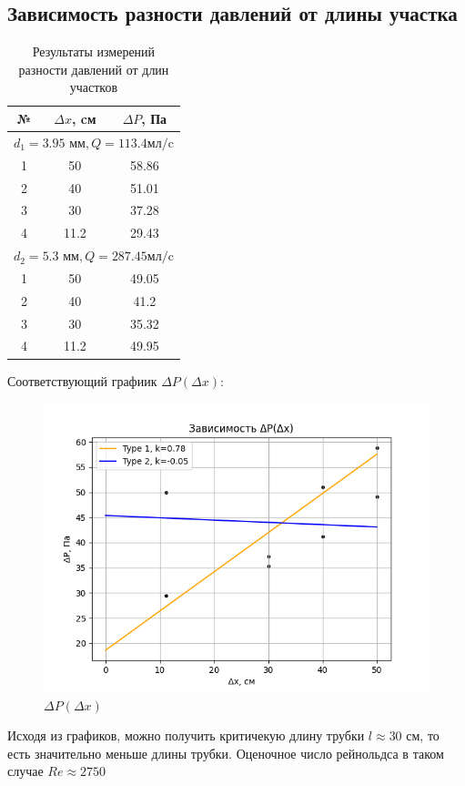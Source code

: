 \documentclass[a4paper, 10pt, twocolumn]{article}
\begin{document}
\subsection{Зависимость разности давлений от длины участка}
\begin{table}[H]
    \centering
    \begin{tabular}{|c|c|c|} \hline
    № & $\Delta x$, cм & $\Delta P$, Па \\ \hline
    \multicolumn{3}{|c|}{$d_1 = 3.95 \text{~мм}, Q = 113.4 \text{мл/c}$} \\ \hline
    1  & 50   & 58.86 \\ \hline
    2  & 40   & 51.01 \\ \hline
    3  & 30   & 37.28 \\ \hline
    4  & 11.2 & 29.43 \\ \hline
    \multicolumn{3}{|c|}{$d_2 = 5.3 \text{~мм}, Q = 287.45 \text{мл/c}$} \\ \hline
    1  & 50   & 49.05 \\ \hline
    2  & 40   & 41.2  \\ \hline
    3  & 30   & 35.32 \\ \hline
    4  & 11.2 & 49.95 \\ \hline
    \end{tabular}
    \caption{Результаты измерений разности давлений от длин участков}
\end{table}
Соответствующий графиик $\Delta P(\Delta x)$:
    \begin{figure}[H]
        \includegraphics[width=1\linewidth]{graphs/figure2.png}
        \begin{center}
            \caption{$\Delta P(\Delta x)$}
        \end{center}
    \end{figure}
    Исходя из графиков, можно получить критичекую длину трубки $l \approx 30$ см, то есть значительно меньше длины трубки.
    Оценочное число рейнольдса в таком случае $Re \approx 2750$
\end{document}
